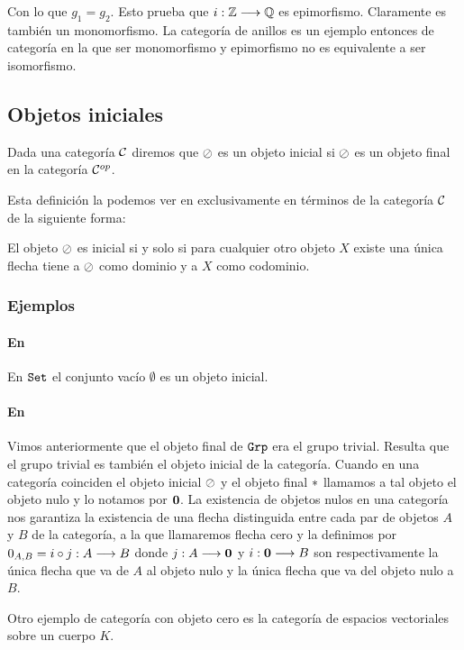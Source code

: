 Con lo que $g_1=g_2$. Esto prueba que $i : \mathbb{Z}\longrightarrow \mathbb{Q}$ es epimorfismo.
Claramente es también un monomorfismo. La categoría de anillos es
un ejemplo entonces de categoría en la que ser monomorfismo y
epimorfismo no es equivalente a ser isomorfismo.

\subsection{Objetos iniciales}
\begin{definition}
Dada una categoría $\mathcal{C}$ diremos que $\oslash$ es un objeto
inicial si $\oslash$ es un objeto final en la categoría
$\mathcal{C}^{op}$.
\end{definition}

Esta definición la podemos ver en exclusivamente en términos
de la categoría $\mathcal{C}$ de la siguiente forma:
\begin{proposition}
El objeto $\oslash$ es inicial si y solo si para cualquier otro objeto
$X$ existe una única flecha tiene a $\oslash$ como dominio y a $X$ como
codominio.
\end{proposition}

\subsubsection{Ejemplos}
\paragraph{En \Set}
En $\texttt{Set}$ el conjunto vacío $\emptyset$ es un objeto inicial.

\paragraph{En \Grp}
Vimos anteriormente que el objeto final de $\texttt{Grp}$ era el grupo
trivial. Resulta que el grupo trivial es también el objeto inicial
de la categoría. Cuando en una categoría coinciden el objeto inicial
$\oslash$ y el objeto final $*$ llamamos a tal objeto el objeto
nulo y lo notamos por $\textbf{0}$. La existencia de objetos nulos en una categoría nos garantiza
la existencia de una flecha distinguida entre cada par de objetos
$A$ y $B$ de la categoría, a la que llamaremos
flecha cero y la definimos por
$0_{A,B} = i \circ j : A\longrightarrow B$ donde
$j: A\longrightarrow \textbf{0}$ y $i : \textbf{0}\longrightarrow B$
son respectivamente la única flecha que va de $A$ al objeto nulo y
la única flecha que va del objeto nulo a $B$.


Otro ejemplo de categoría con objeto cero es la categoría de espacios
vectoriales sobre un cuerpo $K$.

